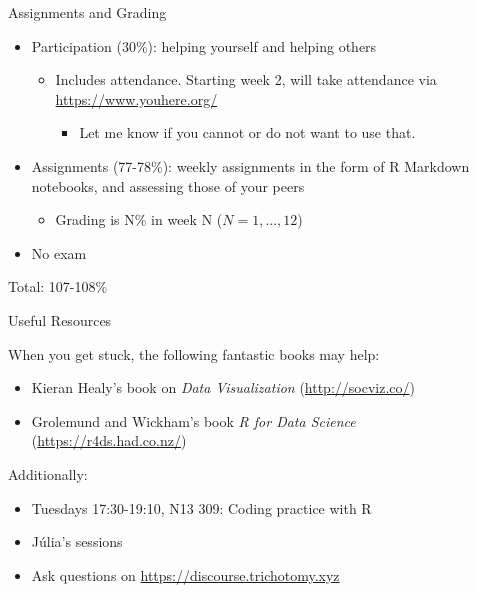 \documentclass[
  ignorenonframetext,
]{beamer}
\providecommand{\tightlist}{%
  \setlength{\itemsep}{0pt}\setlength{\parskip}{0pt}}
\begin{document}
\begin{frame}{Assignments and Grading}
\protect\hypertarget{assignments-and-grading}{}

\begin{itemize}
\tightlist
\item
  Participation (30\%): helping yourself and helping others

  \begin{itemize}
  \tightlist
  \item
    Includes attendance. Starting week 2, will take attendance via
    \url{https://www.youhere.org/}

    \begin{itemize}
    \tightlist
    \item
      Let me know if you cannot or do not want to use that.
    \end{itemize}
  \end{itemize}
\item
  Assignments (77-78\%): weekly assignments in the form of R Markdown
  notebooks, and assessing those of your peers

  \begin{itemize}
  \tightlist
  \item
    Grading is N\% in week N (\(N = 1, ..., 12\))
  \end{itemize}
\item
  No exam
\end{itemize}

\pause{}

Total: 107-108\%

\end{frame}

\begin{frame}{Useful Resources}
\protect\hypertarget{useful-resources}{}

When you get stuck, the following fantastic books may help:

\begin{itemize}
\tightlist
\item
  Kieran Healy's book on \emph{Data Visualization}
  (\url{http://socviz.co/})
\item
  Grolemund and Wickham's book \emph{R for Data Science}
  (\url{https://r4ds.had.co.nz/})
\end{itemize}

Additionally:

\begin{itemize}
\tightlist
\item
  Tuesdays 17:30-19:10, N13 309: Coding practice with R
\item
  Júlia's sessions
\item
  Ask questions on \url{https://discourse.trichotomy.xyz}
\end{itemize}

\end{frame}
\end{document}
